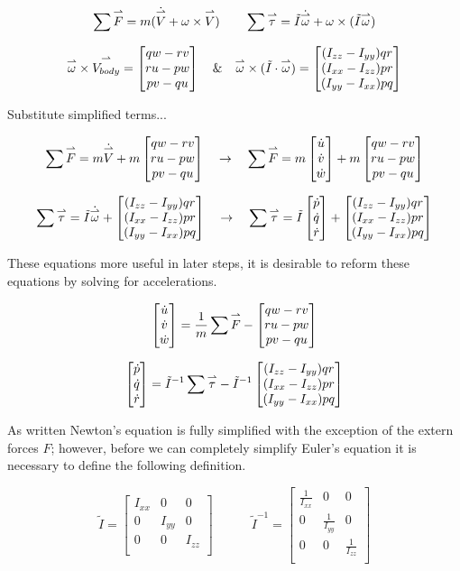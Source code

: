 $$\sum\overset{\rightharpoonup}{F} =  m(\dot{\overset{\rightharpoonup}{V}} + \omega \times \overset{\rightharpoonup}{V})\quad \quad \sum\overset{\rightharpoonup}{\tau} = \tilde{I}\dot{\overset{\rightharpoonup}{\omega}} + \omega \times (\tilde{I}\overset{\rightharpoonup}{\omega})$$


\newline 

$$\overset{\rightharpoonup}{\omega} \times \overset{\rightharpoonup}{V_{body}} = \begin{bmatrix} q w - r v \\ r u -p w \\ p v - q u \end{bmatrix} \quad 
\& \quad \overset{\rightharpoonup}{\omega} \times (\tilde{I}\cdot \overset{\rightharpoonup}{\omega})= \begin{bmatrix} (I_{zz} - I_{yy})qr \\ (I_{xx} - I_{zz})pr \\ (I_{yy}- I_{xx})pq \end{bmatrix}$$



Substitute simplified terms... 

$$\sum\overset{\rightharpoonup}{F} =   m\dot{\overset{\rightharpoonup}{V}} + m\begin{bmatrix} q w - r v \\ r u -p w \\ p v - q u \end{bmatrix} \quad \rightarrow \quad \sum\overset{\rightharpoonup}{F} =   m\begin{bmatrix} \dot{u} \\ \dot{v} \\ \dot{w} \end{bmatrix} + m\begin{bmatrix} q w - r v \\ r u -p w \\ p v - q u \end{bmatrix} $$


$$ \sum\overset{\rightharpoonup}{\tau} = \tilde{I}\dot{\overset{\rightharpoonup}{\omega}} + \begin{bmatrix} (I_{zz} - I_{yy})qr \\ (I_{xx} - I_{zz})pr \\ (I_{yy}- I_{xx})pq \end{bmatrix} \quad \rightarrow \quad \sum\overset{\rightharpoonup}{\tau} = \tilde{I}\begin{bmatrix} \dot{p} \\ \dot{q} \\ \dot{r} \end{bmatrix} + \begin{bmatrix} (I_{zz} - I_{yy})qr \\ (I_{xx} - I_{zz})pr \\ (I_{yy}- I_{xx})pq \end{bmatrix}$$

These equations more useful in later steps, it is desirable to reform these equations by solving for accelerations. 


$$\begin{bmatrix} \dot{u} \\ \dot{v} \\ \dot{w} \end{bmatrix} = \frac{1}{m}\sum\overset{\rightharpoonup}{F} - \begin{bmatrix} q w - r v \\ r u -p w \\ p v - q u \end{bmatrix} $$


$$ \begin{bmatrix} \dot{p} \\ \dot{q} \\ \dot{r} \end{bmatrix} = \tilde{I}^{-1}\sum\overset{\rightharpoonup}{\tau} - \tilde{I}^{-1}\begin{bmatrix} (I_{zz} - I_{yy})qr \\ (I_{xx} - I_{zz})pr \\ (I_{yy}- I_{xx})pq \end{bmatrix}$$

As written Newton's equation is fully simplified with the exception of the extern forces $F$; however, before we can completely simplify Euler's equation it is necessary to define the following definition. 

$$\tilde{I} = \begin{bmatrix}
    I_{xx} & 0 & 0 \\
    0 & I_{yy} & 0 \\
    0 & 0 & I_{zz} \\
\end{bmatrix} \quad \quad \quad \tilde{I}^{-1} = \begin{bmatrix}
    \frac{1}{I_{xx}} & 0 & 0 \\
    0 & \frac{1}{I_{yy}} & 0 \\
    0 & 0 & \frac{1}{I_{zz}} \\
\end{bmatrix} $$

